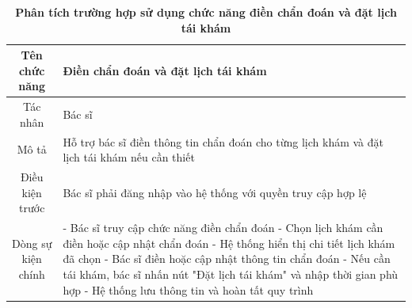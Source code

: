 \begin{table}[H]
	\caption{\bfseries \fontsize{12pt}{0pt}\selectfont Phân tích trường hợp sử dụng chức năng điền chẩn đoán và đặt lịch tái khám}
	\centering
	\begin{tabularx}{0.9\textwidth}{|c|X|}
		\hline
		\textbf{Tên chức năng} & \textbf{Điền chẩn đoán và đặt lịch tái khám}                                                 \\
		\hline
		Tác nhân               & Bác sĩ                                                                                       \\
		\hline
		Mô tả                  & Hỗ trợ bác sĩ điền thông tin chẩn đoán cho từng lịch khám và đặt lịch tái khám nếu cần thiết \\
		\hline
		Điều kiện trước        & Bác sĩ phải đăng nhập vào hệ thống với quyền truy cập hợp lệ                                 \\
		\hline
		Dòng sự kiện chính     &
		- Bác sĩ truy cập chức năng điền chẩn đoán \newline
		- Chọn lịch khám cần điền hoặc cập nhật chẩn đoán \newline
		- Hệ thống hiển thị chi tiết lịch khám đã chọn \newline
		- Bác sĩ điền hoặc cập nhật thông tin chẩn đoán \newline
		- Nếu cần tái khám, bác sĩ nhấn nút "Đặt lịch tái khám" và nhập thời gian phù hợp \newline
		- Hệ thống lưu thông tin và hoàn tất quy trình                                                                        \\
		\hline
	\end{tabularx}
\end{table}

